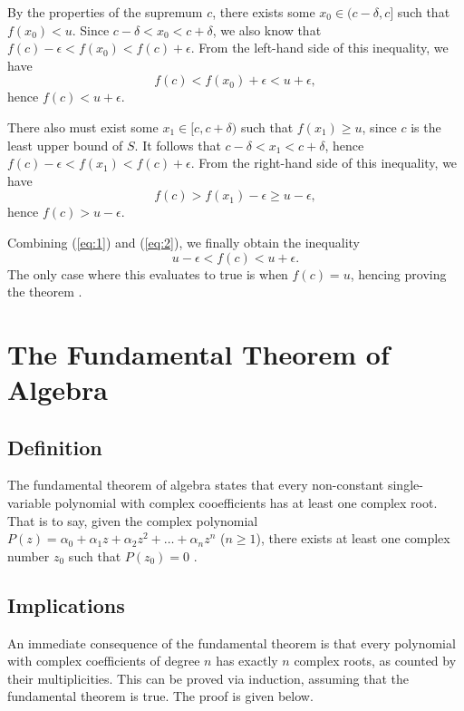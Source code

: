 \documentclass[12pt]{article}
\begin{document}
By the properties of the supremum $c$, there exists some $x_0 \in (c - \delta, c]$ such that $f(x_0) < u$. Since $c - \delta < x_0 < c + \delta$, we also know that $f(c) - \epsilon < f(x_0) < f(c) + \epsilon$. From the left-hand side of this inequality, we have
\begin{equation}
    \label{eq:1}
    f(c) < f(x_0) + \epsilon < u + \epsilon,
\end{equation}
hence $f(c) < u + \epsilon$. \smallskip

There also must exist some $x_1 \in [c, c + \delta)$ such that $f(x_1) \ge u$, since $c$ is the least upper bound of $S$. It follows that $c - \delta < x_1 < c + \delta$, hence $f(c) - \epsilon < f(x_1) < f(c) + \epsilon$. From the right-hand side of this inequality, we have
\begin{equation}
    \label{eq:2}
    f(c) > f(x_1) - \epsilon \ge u - \epsilon,
\end{equation}
hence $f(c) > u - \epsilon$. \smallskip

Combining (\ref{eq:1}) and (\ref{eq:2}), we finally obtain the inequality
\begin{equation*}
    u - \epsilon < f(c) < u + \epsilon.
\end{equation*}
The only case where this evaluates to true is when $f(c) = u$, hencing proving the theorem \parencite{emory-ivt}.

\section{The Fundamental Theorem of Algebra}

\subsection*{Definition}

The fundamental theorem of algebra states that every non-constant single-variable polynomial with complex cooefficients has at least one complex root. That is to say, given the complex polynomial $P(z) = \alpha_0 + \alpha_1 z + \alpha_2 z^2 + \dots + \alpha_n z^n$ ($n \ge 1$), there exists at least one complex number $z_0$ such that $P(z_0) = 0$ \parencite{wikipedia-ftoa}.

\subsection*{Implications}

An immediate consequence of the fundamental theorem is that every polynomial with complex coefficients of degree $n$ has exactly $n$ complex roots, as counted by their multiplicities. This can be proved via induction, assuming that the fundamental theorem is true. The proof is given below. \medskip
\end{document}
